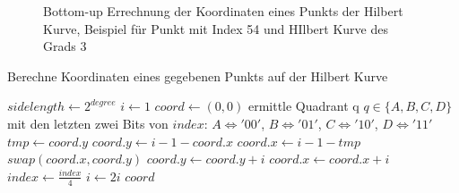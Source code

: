 \documentclass[course=erap]{aspdoc}
\begin{document}
\begin{figure}[H] 
    \centering
    \caption{Bottom-up Errechnung der Koordinaten eines Punkts der Hilbert Kurve, Beispiel für Punkt mit Index 54 und HIlbert Kurve des Grads 3}%
    \label{fig:hilbertBuildup}%
\end{figure}


\begin{algorithm}[H]
\begin{algorithmic}
\caption{Berechne Koordinaten eines gegebenen Punkts auf der Hilbert Kurve}
\label{hilbert:iterative}
	\State $sidelength \leftarrow 2^{degree}$
	\State $i \leftarrow 1$
	\State $coord \leftarrow (0, 0)$
		\State ermittle Quadrant q $q \in \{A, B, C, D\}$ mit den letzten zwei Bits von $index$:
		\State $A \iff '00'$, $B \iff '01'$, $C \iff '10'$, $D \iff '11'$
			\State $tmp \leftarrow coord.y$
			\State $coord.y \leftarrow i - 1 - coord.x$
			\State $coord.x \leftarrow i - 1 - tmp$	
			\Else 
			\State $swap(coord.x, coord.y)$
			\EndIf
		\Else 
		\State $coord.y \leftarrow coord.y + i$ 
		\EndIf
		\State $coord.x \leftarrow coord.x + i$ 
		\EndIf
		\State $index \leftarrow \frac{index}{4}$ 
		\State $i \leftarrow 2i$
	\EndWhile
	\State \Return $coord$
\EndFunction
\end{algorithmic}
\end{algorithm}
\end{document}
